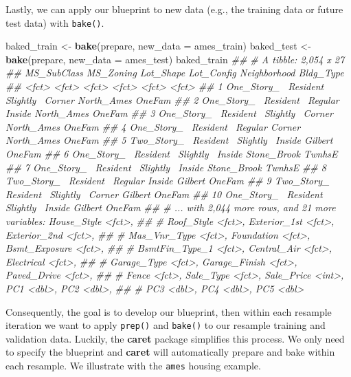 \documentclass[]{krantz}
\makeatletter
\newenvironment{Shaded}{\begin{snugshade}}{\end{snugshade}}
\newcommand{\CommentTok}[1]{\textcolor[rgb]{0.37,0.37,0.37}{\textit{#1}}}
\newcommand{\DataTypeTok}[1]{\textcolor[rgb]{0.27,0.27,0.27}{#1}}
\newcommand{\KeywordTok}[1]{\textcolor[rgb]{0.27,0.27,0.27}{\textbf{#1}}}
\newcommand{\NormalTok}[1]{#1}
\newcommand{\StringTok}[1]{\textcolor[rgb]{0.5,0.5,0.5}{#1}}
\newenvironment{kframe}{%
\medskip{}
\setlength{\fboxsep}{.8em}
 \def\at@end@of@kframe{}%
 \ifinner\ifhmode%
  \def\at@end@of@kframe{\end{minipage}}%
  \begin{minipage}{\columnwidth}%
 \fi\fi%
 \def\FrameCommand##1{\hskip\@totalleftmargin \hskip-\fboxsep
 \colorbox{shadecolor}{##1}\hskip-\fboxsep
     \hskip-\linewidth \hskip-\@totalleftmargin \hskip\columnwidth}%
 \MakeFramed {\advance\hsize-\width
   \@totalleftmargin\z@ \linewidth\hsize
   \@setminipage}}%
 {\par\unskip\endMakeFramed%
 \at@end@of@kframe}
\renewenvironment{Shaded}{\begin{kframe}}{\end{kframe}}
\makeatother
\begin{document}
Lastly, we can apply our blueprint to new data (e.g., the training data or future test data) with \texttt{bake()}.

\begin{Shaded}
\begin{Highlighting}[]
\NormalTok{baked_train <-}\StringTok{ }\KeywordTok{bake}\NormalTok{(prepare, }\DataTypeTok{new_data =}\NormalTok{ ames_train)}
\NormalTok{baked_test <-}\StringTok{ }\KeywordTok{bake}\NormalTok{(prepare, }\DataTypeTok{new_data =}\NormalTok{ ames_test)}
\NormalTok{baked_train}
\CommentTok{## # A tibble: 2,054 x 27}
\CommentTok{##    MS_SubClass MS_Zoning Lot_Shape Lot_Config Neighborhood Bldg_Type}
\CommentTok{##    <fct>       <fct>     <fct>     <fct>      <fct>        <fct>    }
\CommentTok{##  1 One_Story_~ Resident~ Slightly~ Corner     North_Ames   OneFam   }
\CommentTok{##  2 One_Story_~ Resident~ Regular   Inside     North_Ames   OneFam   }
\CommentTok{##  3 One_Story_~ Resident~ Slightly~ Corner     North_Ames   OneFam   }
\CommentTok{##  4 One_Story_~ Resident~ Regular   Corner     North_Ames   OneFam   }
\CommentTok{##  5 Two_Story_~ Resident~ Slightly~ Inside     Gilbert      OneFam   }
\CommentTok{##  6 One_Story_~ Resident~ Slightly~ Inside     Stone_Brook  TwnhsE   }
\CommentTok{##  7 One_Story_~ Resident~ Slightly~ Inside     Stone_Brook  TwnhsE   }
\CommentTok{##  8 Two_Story_~ Resident~ Regular   Inside     Gilbert      OneFam   }
\CommentTok{##  9 Two_Story_~ Resident~ Slightly~ Corner     Gilbert      OneFam   }
\CommentTok{## 10 One_Story_~ Resident~ Slightly~ Inside     Gilbert      OneFam   }
\CommentTok{## # ... with 2,044 more rows, and 21 more variables: House_Style <fct>,}
\CommentTok{## #   Roof_Style <fct>, Exterior_1st <fct>, Exterior_2nd <fct>,}
\CommentTok{## #   Mas_Vnr_Type <fct>, Foundation <fct>, Bsmt_Exposure <fct>,}
\CommentTok{## #   BsmtFin_Type_1 <fct>, Central_Air <fct>, Electrical <fct>,}
\CommentTok{## #   Garage_Type <fct>, Garage_Finish <fct>, Paved_Drive <fct>,}
\CommentTok{## #   Fence <fct>, Sale_Type <fct>, Sale_Price <int>, PC1 <dbl>, PC2 <dbl>,}
\CommentTok{## #   PC3 <dbl>, PC4 <dbl>, PC5 <dbl>}
\end{Highlighting}
\end{Shaded}

Consequently, the goal is to develop our blueprint, then within each resample iteration we want to apply \texttt{prep()} and \texttt{bake()} to our resample training and validation data. Luckily, the \textbf{caret} package simplifies this process. We only need to specify the blueprint and \textbf{caret} will automatically prepare and bake within each resample. We illustrate with the \texttt{ames} housing example.
\end{document}
